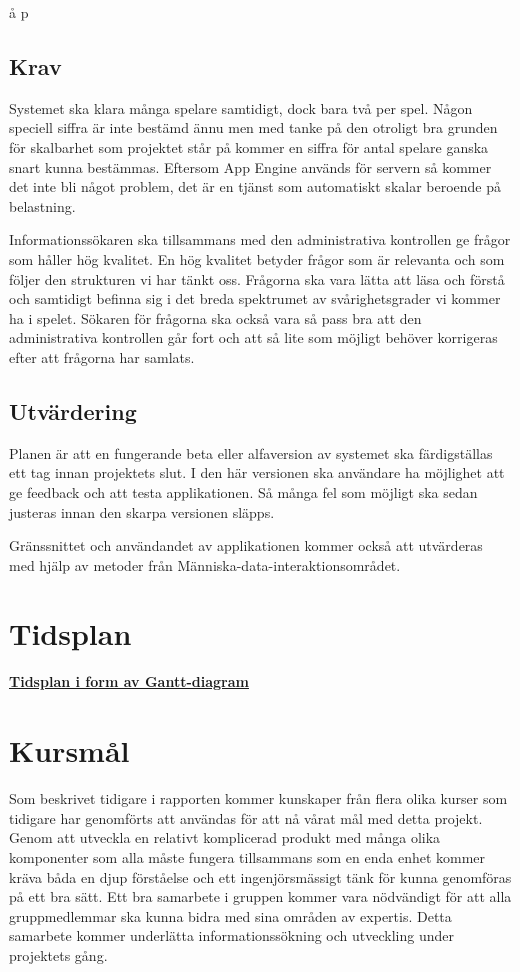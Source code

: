å p\documentclass[swedish,12pt,a4paper]{article}
\begin{document}
\subsection{Krav}
Systemet ska klara många spelare samtidigt, dock bara två per spel. Någon speciell siffra är inte bestämd ännu men med tanke på den otroligt bra grunden för skalbarhet som projektet står på kommer en siffra för antal spelare ganska snart kunna bestämmas. Eftersom App Engine används för servern så kommer det inte bli något problem, det är en tjänst som automatiskt skalar beroende på belastning.

Informationssökaren ska tillsammans med den administrativa kontrollen ge frågor som håller hög kvalitet. En hög kvalitet betyder frågor som är relevanta och som följer den strukturen vi har tänkt oss. Frågorna ska vara lätta att läsa och förstå och samtidigt befinna sig i det breda spektrumet av svårighetsgrader vi kommer ha i spelet. Sökaren för frågorna ska också vara så pass bra att den administrativa kontrollen går fort och att så lite som möjligt behöver korrigeras efter att frågorna har samlats.

\subsection{Utvärdering}
Planen är att en fungerande beta eller alfaversion av systemet ska färdigställas ett tag innan projektets slut. I den här versionen ska användare ha möjlighet att ge feedback och att testa applikationen. Så många fel som möjligt ska sedan justeras innan den skarpa versionen släpps.

Gränssnittet och användandet av applikationen kommer också att utvärderas med hjälp av metoder från Människa-data-interaktionsområdet.
\appendix

\section{Tidsplan}

\textbf{\href{http://www.gantt-chart.com//?td=550c7506aa5a1dd480bd4c8d-845131}{Tidsplan i form av Gantt-diagram}}\\

\section{Kursmål}

Som beskrivet tidigare i rapporten kommer kunskaper från flera olika kurser som tidigare har genomförts att användas för att nå vårat mål med detta projekt. Genom att utveckla en relativt komplicerad produkt med många olika komponenter som alla måste fungera tillsammans som en enda enhet kommer kräva båda en djup förståelse och ett ingenjörsmässigt tänk för kunna genomföras på ett bra sätt.
Ett bra samarbete i gruppen kommer vara nödvändigt för att alla gruppmedlemmar ska kunna bidra med sina områden av expertis. Detta samarbete kommer underlätta informationssökning och utveckling under projektets gång.\\
\end{document}
